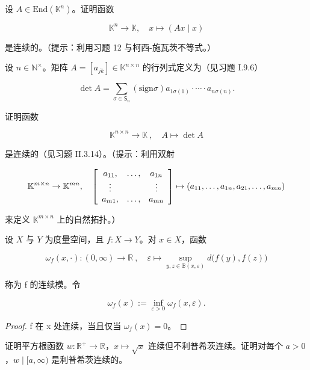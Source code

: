 \begin{exercises}
设 $ A \in \mathrm{End}(\mathbb{K}^n) $。证明函数

\[
\mathbb{K}^{n}\to\mathbb{K},\quad x\mapsto(A x\mid x)
\]

是连续的。（提示：利用习题 12 与柯西-施瓦茨不等式。）

\item[16.]

设 $ n \in \mathbb{N}^\times $。矩阵 $ A = [a_{jk}] \in \mathbb{K}^{n \times n} $ 的行列式定义为（见习题 I.9.6）

\[
\det A=\sum_{\sigma\in\mathsf{S}_{n}}(\mathrm{sign}\sigma)a_{1\sigma(1)}\cdot\cdots\cdot a_{n\sigma(n)}.
\]

证明函数

\[
\mathbb{K}^{n\times n}\to\mathbb{K}~,\quad A\mapsto\det A
\]

是连续的（见习题 II.3.14）。（提示：利用双射

\begin{equation*}
\mathbb{K}^{m\times n}\to\mathbb{K}^{m n},\quad\left[\begin{array}{c c c}{a_{11},}&{\ldots,}&{a_{1n}}\\ {\vdots}&{}&{\vdots}\\ {a_{m1},}&{\ldots,}&{a_{m n}}\\ \end{array}\right]\mapsto\left(a_{11},\ldots,a_{1n},a_{21},\ldots,a_{m n}\right)
\end{equation*}

来定义 $ \mathbb{K}^{m\times n} $ 上的自然拓扑。）

\item[17.]

设 $X$ 与 $Y$ 为度量空间，且 $f: X \to Y$。对 $x \in X$，函数

\[
\omega_{f}(x,\cdot):(0,\infty)\to\mathbb{R}~,\quad\varepsilon\mapsto\sup_{y,z\in\mathbb{B}(x,\varepsilon)}d\big(f(y),f(z)\big)
\]

称为 f 的连续模。令

\[
\omega_{f}(x):=\inf_{\varepsilon>0}\omega_{f}(x,\varepsilon).
\]
\end{exercises}

\begin{proof}

f 在 x 处连续，当且仅当 $ \omega_{f}(x)=0 $。

\end{proof}

\begin{exercises}
\item[18.]

证明平方根函数 $ w: \mathbb{R}^+ \to \mathbb{R} $，$ x \mapsto \sqrt{x} $ 连续但不利普希茨连续。证明对每个 $ a > 0 $，$ w \mid [a, \infty) $ 是利普希茨连续的。

\end{exercises}

